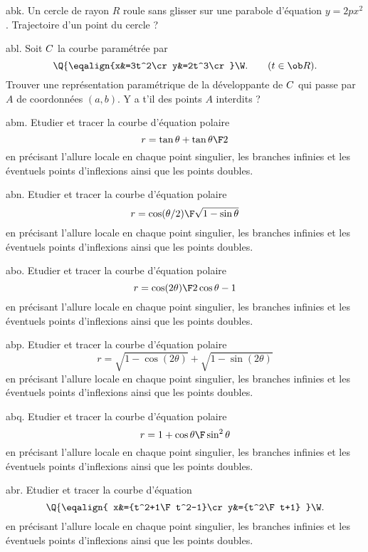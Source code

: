 \exo [Level=2,Fight=2,Learn=1,Field=\Roulement,Type=\Exercices,Origin=] abk. 
Un cercle de rayon $R$ roule sans glisser sur 
une parabole d'équation $y=2px^2$. 
Trajectoire d'un point du cercle ?

\exo [Level=2,Fight=1,Learn=1,Field=\Développantes,Type=\Exercices,Origin=] abl. 
Soit $\sc C$ la courbe paramétrée par $$
\Q\{\eqalign{x&=3t^2\cr y&=2t^3\cr}\W.\qquad(t\in\ob R).
$$
Trouver une représentation paramétrique de la développante de $\sc C$ 
qui passe par $A$ de coordonnées $(a,b)$. Y a t'il des points $A$ interdits ?

\exo [Level=1,Fight=1,Learn=2,Field=\CourbesParamétréesPolaires,Type=\Exercices,Origin=] abm. 
Etudier et tracer la courbe d'équation polaire 
$$
r=\tan\theta+\tan{\theta\F2}
$$ 
en précisant l'allure  locale en chaque point singulier, les branches infinies 
et les éventuels points d'inflexions ainsi que les points doubles. 

\exo [Level=1,Fight=1,Learn=2,Field=\CourbesParamétréesPolaires,Type=\Exercices,Origin=] abn. 
Etudier et tracer la courbe d'équation polaire 
$$
r={\cos(\theta/2)\F\sqrt{1-\sin\theta}}
$$ 
en précisant l'allure  locale en chaque point singulier, les branches infinies 
et les éventuels points d'inflexions ainsi que les points doubles. 

\exo [Level=1,Fight=1,Learn=2,Field=\CourbesParamétréesPolaires,Type=\Exercices,Origin=] abo. 
Etudier et tracer la courbe d'équation polaire 
$$
r={\cos(2\theta)\F2\cos\theta-1}
$$ 
en précisant l'allure  locale en chaque point singulier, les branches infinies 
et les éventuels points d'inflexions ainsi que les points doubles. 

\exo [Level=1,Fight=1,Learn=2,Field=\CourbesParamétréesPolaires,Type=\Exercices,Origin=] abp. 
Etudier et tracer la courbe d'équation polaire 
$$
r=\sqrt{1-\cos(2\theta)}+\sqrt{1-\sin(2\theta)}
$$ 
en précisant l'allure  locale en chaque point singulier, les branches infinies 
et les éventuels points d'inflexions ainsi que les points doubles. 

\exo [Level=1,Fight=1,Learn=2,Field=\CourbesParamétréesPolaires,Type=\Exercices,Origin=] abq. 
Etudier et tracer la courbe d'équation polaire 
$$
r={1+\cos\theta\F\sin^2\theta}
$$ 
en précisant l'allure  locale en chaque point singulier, les branches infinies 
et les éventuels points d'inflexions ainsi que les points doubles. 


\exo [Level=1,Fight=0,Learn=1,Field=\CourbesParamétréesCartésiennes,Type=\Exercices,Origin=] abr. 
Etudier et tracer la courbe d'équation 
$$
\Q\{\eqalign{
x&={t^2+1\F t^2-1}\cr
y&={t^2\F t+1}
}\W.
$$ 
en précisant l'allure  locale en chaque point singulier, les branches infinies 
et les éventuels points d'inflexions ainsi que les points doubles. 

